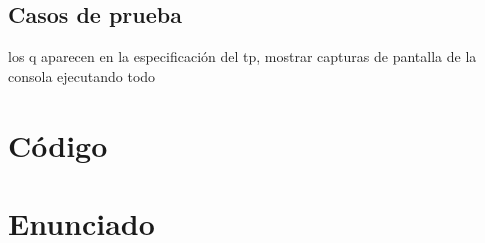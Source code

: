 \documentclass{article}
\begin{document}
  \subsection{Casos de prueba}
  los q aparecen en la especificación del tp, mostrar capturas de pantalla
  de la consola ejecutando todo

\section{Código}


%    

\section{Enunciado}
\end{document}
